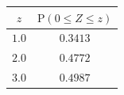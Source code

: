 {\setlength{\tabcolsep}{4pt}\renewcommand{\arraystretch}{1.3}\small%
\begin{tabular}{|c|c|}
\hline
$z$ & $\mathrm{P}(0\le Z\le z)$ \\
\hline
$1.0$ & $0.3413$ \\
\hline
$2.0$ & $0.4772$ \\
\hline
$3.0$ & $0.4987$ \\
\hline
\end{tabular}}
